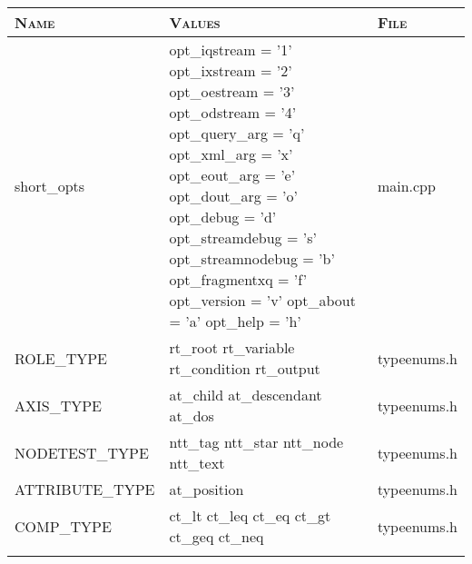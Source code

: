 \begin{tiny}
\begin{longtable}[ht]{|p{0.225\tablwidth}|p{0.375\tablwidth}|p{0.3\tablwidth}|}
  \hline \cellcolor{tablefirstrowcolor} \textsc{Name} & \cellcolor{tablefirstrowcolor} \textsc{Values} & \cellcolor{tablefirstrowcolor} \textsc{File} \\
  \hline short\_opts & opt\_iqstream = '1' \newline opt\_ixstream = '2' \newline opt\_oestream = '3' \newline opt\_odstream = '4' \newline opt\_query\_arg = 'q' \newline opt\_xml\_arg = 'x' \newline opt\_eout\_arg = 'e' \newline opt\_dout\_arg = 'o' \newline opt\_debug = 'd' \newline opt\_streamdebug = 's' \newline opt\_streamnodebug = 'b' \newline opt\_fragmentxq = 'f' \newline opt\_version = 'v' \newline opt\_about = 'a' \newline opt\_help = 'h' & main.cpp \\
  \hline ROLE\_TYPE & rt\_root \newline rt\_variable \newline rt\_condition \newline rt\_output & typeenums.h \\
  \hline AXIS\_TYPE & at\_child \newline at\_descendant \newline at\_dos & typeenums.h \\
  \hline NODETEST\_TYPE & ntt\_tag \newline ntt\_star \newline ntt\_node \newline ntt\_text & typeenums.h \\
  \hline ATTRIBUTE\_TYPE & at\_position & typeenums.h \\
  \hline COMP\_TYPE & ct\_lt \newline ct\_leq \newline ct\_eq \newline ct\_gt \newline ct\_geq \newline ct\_neq & typeenums.h \\

  \newpage


\end{longtable}
\end{tiny}
